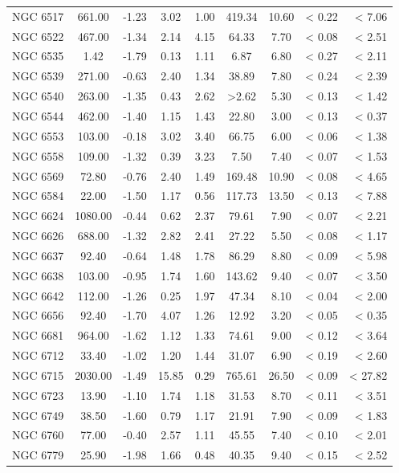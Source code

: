 \documentclass[doublespace,nopageskip]{VTthesis}
\begin{document}
\begin{appendices}
\begin{center}
\begin{longtable}{lcccccccr}
NGC 6517 & 661.00 & -1.23 & 3.02 & 1.00 & 419.34 & 10.60 & < 0.22 & < 7.06\\
NGC 6522 & 467.00 & -1.34 & 2.14 & 4.15 & 64.33 & 7.70 & < 0.08 & < 2.51\\
NGC 6535 & 1.42 & -1.79 & 0.13 & 1.11 & 6.87 & 6.80 & < 0.27 & < 2.11\\
NGC 6539 & 271.00 & -0.63 & 2.40 & 1.34 & 38.89 & 7.80 & < 0.24 & < 2.39\\
NGC 6540 & 263.00 & -1.35 & 0.43 & 2.62 & >2.62 & 5.30 & < 0.13 & < 1.42\\
NGC 6544 & 462.00 & -1.40 & 1.15 & 1.43 & 22.80 & 3.00 & < 0.13 & < 0.37\\
NGC 6553 & 103.00 & -0.18 & 3.02 & 3.40 & 66.75 & 6.00 & < 0.06 & < 1.38\\
NGC 6558 & 109.00 & -1.32 & 0.39 & 3.23 & 7.50 & 7.40 & < 0.07 & < 1.53\\
NGC 6569 & 72.80 & -0.76 & 2.40 & 1.49 & 169.48 & 10.90 & < 0.08 & < 4.65\\
NGC 6584 & 22.00 & -1.50 & 1.17 & 0.56 & 117.73 & 13.50 & < 0.13 & < 7.88\\
NGC 6624 & 1080.00 & -0.44 & 0.62 & 2.37 & 79.61 & 7.90 & < 0.07 & < 2.21\\
NGC 6626 & 688.00 & -1.32 & 2.82 & 2.41 & 27.22 & 5.50 & < 0.08 & < 1.17\\
NGC 6637 & 92.40 & -0.64 & 1.48 & 1.78 & 86.29 & 8.80 & < 0.09 & < 5.98\\
NGC 6638 & 103.00 & -0.95 & 1.74 & 1.60 & 143.62 & 9.40 & < 0.07 & < 3.50\\
NGC 6642 & 112.00 & -1.26 & 0.25 & 1.97 & 47.34 & 8.10 & < 0.04 & < 2.00\\
NGC 6656 & 92.40 & -1.70 & 4.07 & 1.26 & 12.92 & 3.20 & < 0.05 & < 0.35\\
NGC 6681 & 964.00 & -1.62 & 1.12 & 1.33 & 74.61 & 9.00 & < 0.12 & < 3.64\\
NGC 6712 & 33.40 & -1.02 & 1.20 & 1.44 & 31.07 & 6.90 & < 0.19 & < 2.60\\
NGC 6715 & 2030.00 & -1.49 & 15.85 & 0.29 & 765.61 & 26.50 & < 0.09 & < 27.82\\
NGC 6723 & 13.90 & -1.10 & 1.74 & 1.18 & 31.53 & 8.70 & < 0.11 & < 3.51\\
NGC 6749 & 38.50 & -1.60 & 0.79 & 1.17 & 21.91 & 7.90 & < 0.09 & < 1.83\\
NGC 6760 & 77.00 & -0.40 & 2.57 & 1.11 & 45.55 & 7.40 & < 0.10 & < 2.01\\
NGC 6779 & 25.90 & -1.98 & 1.66 & 0.48 & 40.35 & 9.40 & < 0.15 & < 2.52\\

\end{longtable}
\end{center}
\end{appendices}
\end{document}
